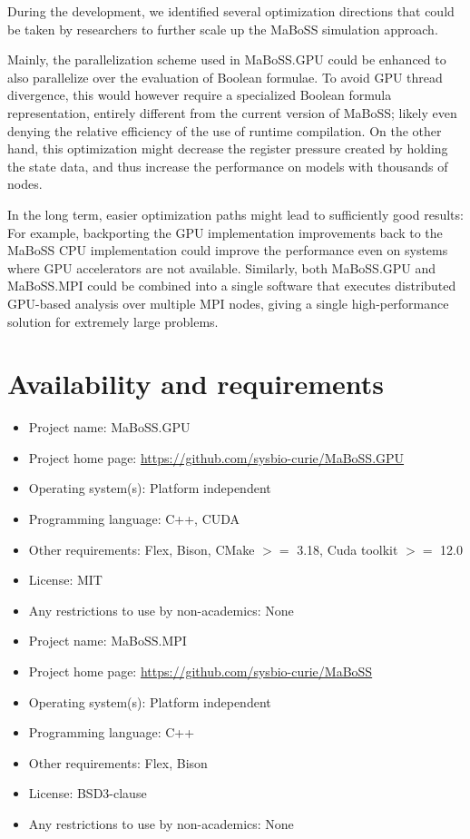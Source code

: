 \documentclass[sn-mathphys-num]{sn-jnl}%
\begin{document}
During the development, we identified several optimization directions that could be taken by researchers to further scale up the MaBoSS simulation approach.

Mainly, the parallelization scheme used in MaBoSS.GPU could be enhanced to also parallelize over the evaluation of Boolean formulae. To avoid GPU thread divergence, this would however require a specialized Boolean formula representation, entirely different from the current version of MaBoSS; likely even denying the relative efficiency of the use of runtime compilation. On the other hand, this optimization might decrease the register pressure created by holding the state data, and thus increase the performance on models with thousands of nodes.

In the long term, easier optimization paths might lead to sufficiently good results: For example, backporting the GPU implementation improvements back to the MaBoSS CPU implementation could improve the performance even on systems where GPU accelerators are not available. Similarly, both MaBoSS.GPU and MaBoSS.MPI could be combined into a single software that executes distributed GPU-based analysis over multiple MPI nodes, giving a single high-performance solution for extremely large problems.

\section*{Availability and requirements}
\begin{itemize}
	\item Project name: MaBoSS.GPU
	\item Project home page: \url{https://github.com/sysbio-curie/MaBoSS.GPU}
	\item Operating system(s): Platform independent
	\item Programming language: C++, CUDA
	\item Other requirements: Flex, Bison, CMake $>=$ 3.18, Cuda toolkit $>=$ 12.0
	\item License: MIT
	\item Any restrictions to use by non-academics: None
\end{itemize}

\begin{itemize}
	\item Project name: MaBoSS.MPI
	\item Project home page: \url{https://github.com/sysbio-curie/MaBoSS}
	\item Operating system(s): Platform independent
	\item Programming language: C++
	\item Other requirements: Flex, Bison
	\item License: BSD3-clause
	\item Any restrictions to use by non-academics: None
\end{itemize}
\end{document}
